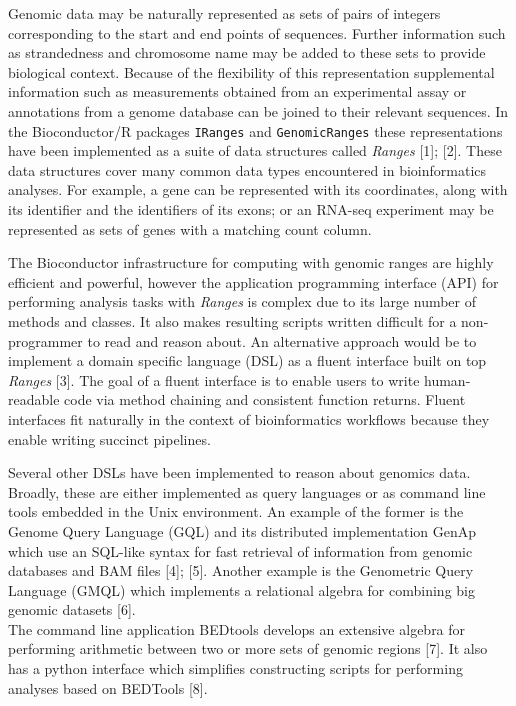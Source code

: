 \documentclass[10pt,letterpaper]{article}
\begin{document}
Genomic data may be naturally represented as sets of pairs of integers
corresponding to the start and end points of sequences. Further
information such as strandedness and chromosome name may be added to
these sets to provide biological context. Because of the flexibility of
this representation supplemental information such as measurements
obtained from an experimental assay or annotations from a genome
database can be joined to their relevant sequences. In the
Bioconductor/R packages \texttt{IRanges} and \texttt{GenomicRanges}
these representations have been implemented as a suite of data
structures called \emph{Ranges} {[}1{]}; {[}2{]}. These data structures
cover many common data types encountered in bioinformatics analyses. For
example, a gene can be represented with its coordinates, along with its
identifier and the identifiers of its exons; or an RNA-seq experiment
may be represented as sets of genes with a matching count column.

The Bioconductor infrastructure for computing with genomic ranges are
highly efficient and powerful, however the application programming
interface (API) for performing analysis tasks with \emph{Ranges} is
complex due to its large number of methods and classes. It also makes
resulting scripts written difficult for a non-programmer to read and
reason about. An alternative approach would be to implement a domain
specific language (DSL) as a fluent interface built on top \emph{Ranges}
{[}3{]}. The goal of a fluent interface is to enable users to write
human-readable code via method chaining and consistent function returns.
Fluent interfaces fit naturally in the context of bioinformatics
workflows because they enable writing succinct pipelines.

Several other DSLs have been implemented to reason about genomics data.
Broadly, these are either implemented as query languages or as command
line tools embedded in the Unix environment. An example of the former is
the Genome Query Language (GQL) and its distributed implementation GenAp
which use an SQL-like syntax for fast retrieval of information from
genomic databases and BAM files {[}4{]}; {[}5{]}. Another example is the
Genometric Query Language (GMQL) which implements a relational algebra
for combining big genomic datasets {[}6{]}.\\
The command line application BEDtools develops an extensive algebra for
performing arithmetic between two or more sets of genomic regions
{[}7{]}. It also has a python interface which simplifies constructing
scripts for performing analyses based on BEDTools {[}8{]}.
\end{document}
